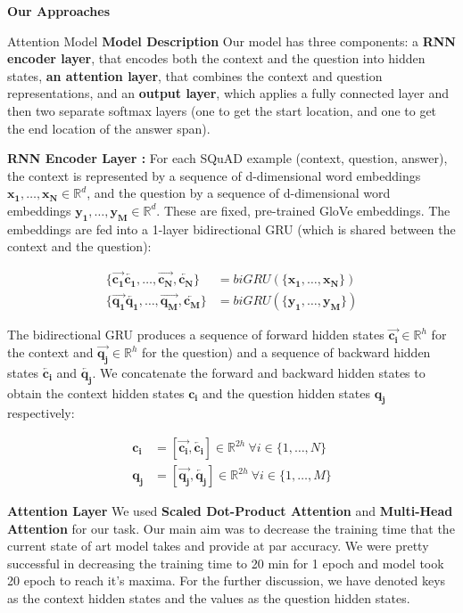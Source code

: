 \documentclass{article}
\newcommand{\tb}[1]{\textbf{#1}}
\newcommand{\mb}[1]{\boldsymbol{#1}}
\newcommand{\ora}[1]{\overrightarrow{#1}}
\newcommand{\ola}[1]{\overleftarrow{#1}}
\begin{document}
\begin{psection}{\textbf{Our Approaches}}
\begin{psubsection}{Attention Model}
\tb{Model Description}
Our  model has three components: a \tb{RNN encoder layer}, that encodes both the context and the question into hidden states, \tb{an attention layer}, that combines the context and question representations, and an \tb{output layer}, which applies a fully connected layer and then two separate softmax layers (one to get the start location, and one to get the end location of the answer span).

\tb{RNN Encoder Layer : }For each SQuAD example (context, question, answer), the context is represented by a sequence of d-dimensional word embeddings $\mb{x_1},\dots,\mb{x_N} \in \mathbb{R}^    d$, and the question by a sequence of d-dimensional word embeddings $\mb{y_1},\dots,\mb{y_M}\in \mathbb{R}^d$. These are fixed, pre-trained GloVe embeddings. The embeddings are fed into a 1-layer bidirectional GRU (which is shared between the context and the question):

\begin{align*}
    \{\ora{\mb{c_1}}\ola{\mb{c_1}},\dots,\ora{\mb{c_N}},\ola{\mb{c_N}}\} &= biGRU(\{\mb{x_1},\dots,\mb{x_N}\}) \\
     \{\ora{\mb{q_1}}\ola{\mb{q_1}},\dots,\ora{\mb{q_M}},\ola{\mb{c_M}}\} &= biGRU(\{\mb{y_1},\dots,\mb{y_M}\})
\end{align*}

The bidirectional GRU produces a sequence of forward hidden states $\ora{\mb{c_i}}\in \mathbb{R}^h$ for the context and $\ora{\mb{q_j}}\in \mathbb{R}^h$ for the question) and a sequence of backward hidden states $\ola{\mb{c_i}}$ and $\ola{\mb{q_j}}$. We concatenate the forward and backward hidden states to obtain the context hidden states $\mb{c_i}$ and the question
hidden states $\mb{q_j}$ respectively:

\begin{align*}
    \mb{c_i} & = [\ora{\mb{c_i}},\ola{\mb{c_i}}] \in \mathbb{R}^{2h} \ \forall i \in \{1,\dots,N\}\\
    \mb{q_j} & = [\ora{\mb{q_j}},\ola{\mb{q_j}}] \in \mathbb{R}^{2h} \ \forall i \in \{1,\dots,M\}
\end{align*}

\tb{Attention Layer}
 We used \textbf{ Scaled Dot-Product Attention} and \textbf{Multi-Head Attention} for our task.  Our main  aim was to decrease the training time that the current state of art model takes and provide at par accuracy. We were pretty successful in decreasing the training time to 20 min for 1 epoch and model took 20 epoch to reach it's maxima.  For the further discussion, we have denoted keys as the context hidden states and the values as the question hidden states.


\end{psubsection}
\end{psection}
\end{document}
